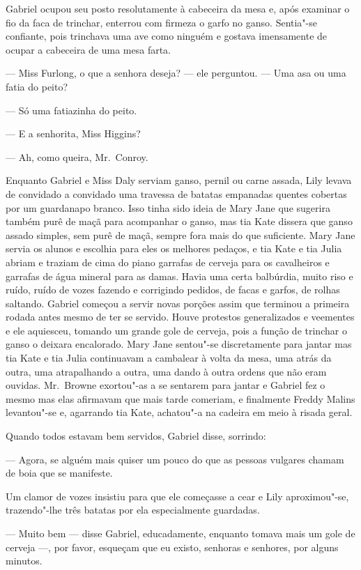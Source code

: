 Gabriel ocupou seu posto resolutamente à cabeceira da mesa e, após examinar o
fio da faca de trinchar, enterrou com firmeza o garfo no ganso.  Sentia"-se
confiante, pois trinchava uma ave como ninguém e gostava imensamente de ocupar
a cabeceira de uma mesa farta.

--- Miss Furlong, o que a senhora deseja? --- ele perguntou.  --- Uma asa ou
uma fatia do peito?

--- Só uma fatiazinha do peito.

--- E a senhorita, Miss Higgins?

--- Ah, como queira, Mr.~Conroy.

Enquanto Gabriel e Miss Daly serviam ganso, pernil ou carne assada, Lily levava
de convidado a convidado uma travessa de batatas empanadas quentes cobertas por
um guardanapo branco.  Isso tinha sido ideia de Mary Jane que sugerira também
purê de maçã para acompanhar o ganso, mas tia Kate dissera que ganso assado
simples, sem purê de maçã, sempre fora mais do que suficiente.  Mary Jane
servia os alunos e escolhia para eles os melhores pedaços, e tia Kate e tia
Julia abriam e traziam de cima do piano garrafas de cerveja para os cavalheiros
e garrafas de água mineral para as damas.  Havia uma certa balbúrdia, muito
riso e ruído, ruído de vozes fazendo e corrigindo pedidos, de facas e garfos,
de rolhas saltando.  Gabriel começou a servir novas porções assim que terminou
a primeira rodada antes mesmo de ter se servido.  Houve protestos generalizados
e veementes e ele aquiesceu, tomando um grande gole de cerveja, pois a função
de trinchar o ganso o deixara encalorado.  Mary Jane sentou"-se discretamente
para jantar mas tia Kate e tia Julia continuavam a cambalear à volta da mesa,
uma atrás da outra, uma atrapalhando a outra, uma dando à outra ordens que não
eram ouvidas.  Mr.~Browne exortou"-as a se sentarem para jantar e Gabriel fez o
mesmo mas elas afirmavam que mais tarde comeriam, e finalmente Freddy Malins
levantou"-se e, agarrando tia Kate, achatou"-a na cadeira em meio à risada geral.

Quando todos estavam bem servidos, Gabriel disse, sorrindo:

--- Agora, se alguém mais quiser um pouco do que as pessoas vulgares chamam de
boia que se manifeste.

Um clamor de vozes insistiu para que ele começasse a cear e Lily aproximou"-se,
trazendo"-lhe três batatas por ela especialmente guardadas.

--- Muito bem --- disse Gabriel, educadamente, enquanto tomava mais um gole de
cerveja ---, por favor, esqueçam que eu existo, senhoras e senhores, por alguns
minutos.

